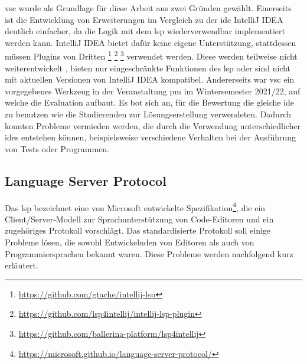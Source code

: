 \ac{vsc} wurde als Grundlage für diese Arbeit aus zwei Gründen gewählt.
Einerseits ist die Entwicklung von Erweiterungen im Vergleich zu der \ac{ide} IntelliJ IDEA deutlich einfacher, da die Logik mit dem \ac{lsp} wiederverwendbar implementiert werden kann.
IntelliJ IDEA bietet dafür keine eigene Unterstützung, stattdessen müssen Plugins von Dritten
\footnote{\url{https://github.com/gtache/intellij-lsp}\label{fn:intellij-lsp}}
\footnote{\url{https://github.com/lsp4intellij/intellij-lsp-plugin}\label{fn:intellij-lsp-plugin}}
\footnote{\url{https://github.com/ballerina-platform/lsp4intellij}\label{fn:lsp4intellij}}
verwendet werden.
Diese werden teilweise nicht weiterentwickelt , bieten nur eingeschränkte Funktionen des \ac{lsp} oder sind nicht mit aktuellen Versionen von IntelliJ IDEA kompatibel.
Andererseits war \ac{vsc} ein vorgegebenes Werkzeug in der Veranstaltung \ac{pm} im Wintersemester 2021/22, auf welche die Evaluation aufbaut.
Es bot sich an, für die Bewertung die gleiche \ac{ide} zu benutzen wie die Studierenden zur Lösungserstellung verwendeten.
Dadurch konnten Probleme vermieden werden, die durch die Verwendung unterschiedlicher \acp{ide} entstehen können, beispielsweise verschiedene Verhalten bei der Ausführung von Tests oder Programmen.

\subsection{Language Server Protocol}\label{subsec:language-server-protocol}

Das \ac{lsp} bezeichnet eine von Microsoft entwickelte Spezifikation\footnote{\url{https://microsoft.github.io/language-server-protocol/}}, die ein Client/Server-Modell zur Sprachunterstützung von Code-Editoren und ein zugehöriges Protokoll vorschlägt.
Das standardisierte Protokoll soll einige Probleme lösen, die sowohl Entwickelnden von Editoren als auch von Programmiersprachen bekannt waren.
Diese Probleme werden nachfolgend kurz erläutert.

